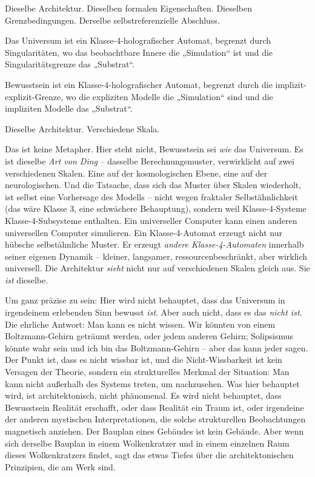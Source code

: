 \documentclass[11pt, twoside, openright]{book}
\begin{document}
Dieselbe Architektur. Dieselben formalen Eigenschaften. Dieselben Grenzbedingungen. Derselbe selbstreferenzielle Abschluss.

Das Universum ist ein Klasse-4-holografischer Automat, begrenzt durch Singularitäten, wo das beobachtbare Innere die „Simulation“ ist und die Singularitätsgrenze das „Substrat“.

Bewusstsein ist ein Klasse-4-holografischer Automat, begrenzt durch die implizit-explizit-Grenze, wo die expliziten Modelle die „Simulation“ sind und die impliziten Modelle das „Substrat“.

Dieselbe Architektur. Verschiedene Skala.

Das ist keine Metapher. Hier steht nicht, Bewusstsein sei \textit{wie} das Universum. Es ist dieselbe \textit{Art von Ding} -- dasselbe Berechnungsmuster, verwirklicht auf zwei verschiedenen Skalen. Eine auf der kosmologischen Ebene, eine auf der neurologischen. Und die Tatsache, dass sich das Muster über Skalen wiederholt, ist selbst eine Vorhersage des Modells -- nicht wegen fraktaler Selbstähnlichkeit (das wäre Klasse 3, eine schwächere Behauptung), sondern weil Klasse-4-Systeme Klasse-4-Subsysteme enthalten. Ein universeller Computer kann einen anderen universellen Computer simulieren. Ein Klasse-4-Automat erzeugt nicht nur hübsche selbstähnliche Muster. Er erzeugt \textit{andere Klasse-4-Automaten} innerhalb seiner eigenen Dynamik -- kleiner, langsamer, ressourcenbeschränkt, aber wirklich universell. Die Architektur \textit{sieht} nicht nur auf verschiedenen Skalen gleich aus. Sie \textit{ist} dieselbe.

Um ganz präzise zu sein: Hier wird nicht behauptet, dass das Universum in irgendeinem erlebenden Sinn bewusst \textit{ist}. Aber auch nicht, dass es das \textit{nicht ist}. Die ehrliche Antwort: Man kann es nicht wissen. Wir könnten von einem Boltzmann-Gehirn geträumt werden, oder jedem anderen Gehirn; Solipsismus könnte wahr sein und ich bin das Boltzmann-Gehirn -- aber das kann jeder sagen. Der Punkt ist, dass es nicht wissbar ist, und die Nicht-Wissbarkeit ist kein Versagen der Theorie, sondern ein strukturelles Merkmal der Situation: Man kann nicht außerhalb des Systems treten, um nachzusehen. Was hier behauptet wird, ist architektonisch, nicht phänomenal. Es wird nicht behauptet, dass Bewusstsein Realität erschafft, oder dass Realität ein Traum ist, oder irgendeine der anderen mystischen Interpretationen, die solche strukturellen Beobachtungen magnetisch anziehen. Der Bauplan eines Gebäudes ist kein Gebäude. Aber wenn sich derselbe Bauplan in einem Wolkenkratzer und in einem einzelnen Raum dieses Wolkenkratzers findet, sagt das etwas Tiefes über die architektonischen Prinzipien, die am Werk sind.
\end{document}
